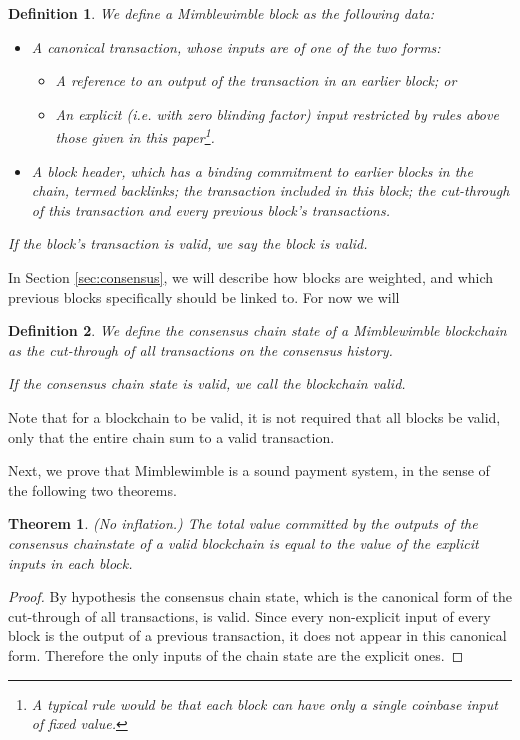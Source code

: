 \documentclass[letterpaper]{article}
\newtheorem{thrm}{Theorem}
\newtheorem{defn}{Definition}
\begin{document}
\begin{defn} We define a \emph{Mimblewimble block} as the following data:
\begin{itemize}
\item A canonical transaction, whose inputs are of one of the two forms:
\begin{itemize}
\item A reference to an output of the transaction in an earlier block; or
\item An explicit (\emph{i.e.} with zero blinding factor) input restricted
by rules above those given in this paper\footnote{A typical rule would be
that each block can have only a single \emph{coinbase input} of fixed
value.}.
\end{itemize}
\item A \emph{block header}, which has a binding commitment to earlier
blocks in the chain, termed \emph{backlinks}; the transaction included in
this block; the cut-through of this transaction and every previous block's
transactions.
\end{itemize}
If the block's transaction is valid, we say the block is \emph{valid}.
\end{defn}

In Section \ref{sec:consensus}, we will describe how blocks are weighted,
and which previous blocks specifically should be linked to. For now we
will 

\begin{defn} We define the \emph{consensus chain state} of a Mimblewimble
blockchain as the cut-through of all transactions on the consensus history.

If the consensus chain state is valid, we call the blockchain \emph{valid}.
\end{defn}
Note that for a blockchain to be valid, it is not required that all blocks
be valid, only that the entire chain sum to a valid transaction.

Next, we prove that Mimblewimble is a sound payment system, in the sense
of the following two theorems.
\begin{thrm} (No inflation.) The total value committed by the outputs of
the consensus chainstate of a valid blockchain is equal to the value of
the explicit inputs in each block.
\end{thrm}
\begin{proof} By hypothesis the consensus chain state, which is the canonical
form of the cut-through of all transactions, is valid. Since every non-explicit
input of every block is the output of a previous transaction, it does not appear
in this canonical form. Therefore the only inputs of the chain state are the
explicit ones.
\end{proof}
\end{document}

